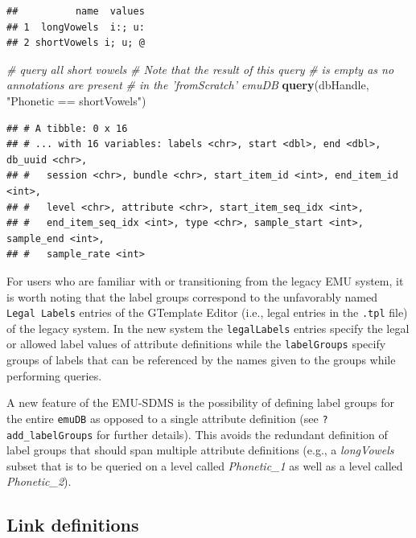 \documentclass[]{book}
\newenvironment{Shaded}{\begin{snugshade}}{\end{snugshade}}
\newcommand{\CommentTok}[1]{\textcolor[rgb]{0.56,0.35,0.01}{\textit{#1}}}
\newcommand{\KeywordTok}[1]{\textcolor[rgb]{0.13,0.29,0.53}{\textbf{#1}}}
\newcommand{\NormalTok}[1]{#1}
\newcommand{\StringTok}[1]{\textcolor[rgb]{0.31,0.60,0.02}{#1}}
\begin{document}
\begin{verbatim}
##          name  values
## 1  longVowels  i:; u:
## 2 shortVowels i; u; @
\end{verbatim}

\begin{Shaded}
\begin{Highlighting}[]
\CommentTok{# query all short vowels}
\CommentTok{# Note that the result of this query}
\CommentTok{# is empty as no annotations are present}
\CommentTok{# in the 'fromScratch' emuDB}
\KeywordTok{query}\NormalTok{(dbHandle, }\StringTok{"Phonetic == shortVowels"}\NormalTok{)}
\end{Highlighting}
\end{Shaded}

\begin{verbatim}
## # A tibble: 0 x 16
## # ... with 16 variables: labels <chr>, start <dbl>, end <dbl>, db_uuid <chr>,
## #   session <chr>, bundle <chr>, start_item_id <int>, end_item_id <int>,
## #   level <chr>, attribute <chr>, start_item_seq_idx <int>,
## #   end_item_seq_idx <int>, type <chr>, sample_start <int>, sample_end <int>,
## #   sample_rate <int>
\end{verbatim}

For users who are familiar with or transitioning from the legacy EMU system, it is worth noting that the label groups correspond to the unfavorably named \texttt{Legal\ Labels} entries of the GTemplate Editor (i.e., legal entries in the \texttt{.tpl} file) of the legacy system. In the new system the \texttt{legalLabels} entries specify the legal or allowed label values of attribute definitions while the \texttt{labelGroups} specify groups of labels that can be referenced by the names given to the groups while performing queries.

A new feature of the EMU-SDMS is the possibility of defining label groups for the entire \texttt{emuDB} as opposed to a single attribute definition (see \texttt{?add\_labelGroups} for further details). This avoids the redundant definition of label groups that should span multiple attribute definitions (e.g., a \emph{longVowels} subset that is to be queried on a level called \emph{Phonetic\_1} as well as a level called \emph{Phonetic\_2}).

\hypertarget{link-definitions}{%
\subsection{Link definitions}\label{link-definitions}}
\end{document}
